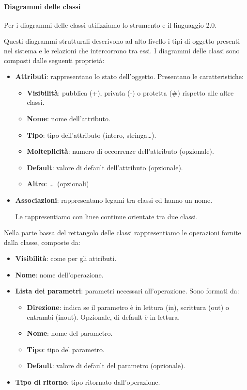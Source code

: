 		\paragraph{Diagrammi delle classi}\label{PP:Sviluppo:DiagrammiClassi}
		Per i diagrammi delle classi utilizziamo lo strumento  e il linguaggio  2.0.\par
        Questi diagrammi strutturali descrivono ad alto livello i tipi di oggetto presenti nel sistema e le relazioni che intercorrono tra essi.
		I diagrammi delle classi sono composti dalle seguenti proprietà:
		\begin{itemize}
			\item \textbf{Attributi}: rappresentano lo stato dell'oggetto. Presentano le caratteristiche:
			    \begin{itemize}
			        \item \textbf{Visibilità}: pubblica (+), privata (-) o protetta (\#) rispetto alle altre classi.
			        \item \textbf{Nome}: nome dell'attributo.
			        \item \textbf{Tipo}: tipo dell'attributo (intero, stringa\dots).
			        \item \textbf{Molteplicità}: numero di occorrenze dell'attributo (opzionale).
			        \item \textbf{Default}: valore di default dell'attributo (opzionale).
                    \item \textbf{Altro}: \dots~(opzionali)
			    \end{itemize}
			\item \textbf{Associazioni}: rappresentano legami tra classi ed hanno un nome.\par
                        Le rappresentiamo con linee continue orientate tra due classi.
		\end{itemize}
        Nella parte bassa del rettangolo delle classi rappresentiamo le operazioni fornite dalla classe, composte da:
        \begin{itemize}
            \item \textbf{Visibilità}: come per gli attributi.
            \item \textbf{Nome}: nome dell'operazione.
            \item \textbf{Lista dei parametri}: parametri necessari all'operazione. Sono formati da:
            \begin{itemize}
                \item \textbf{Direzione}: indica se il parametro è in lettura (in), scrittura (out) o entrambi (inout). Opzionale, di default è in lettura.
                \item \textbf{Nome}: nome del parametro.
                \item \textbf{Tipo}: tipo del parametro.
                \item \textbf{Default}: valore di default del parametro (opzionale).
            \end{itemize}
            \item \textbf{Tipo di ritorno}: tipo ritornato dall'operazione.
        \end{itemize}
